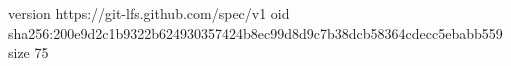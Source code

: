 version https://git-lfs.github.com/spec/v1
oid sha256:200e9d2c1b9322b624930357424b8ec99d8d9c7b38dcb58364cdecc5ebabb559
size 75
